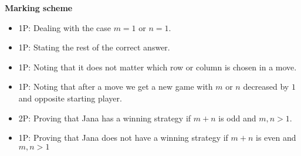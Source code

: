 {\newpage

\textbf{Marking scheme}

\begin{itemize}
    \item 1P: Dealing with the case $m=1$ or $n=1$.
    \item 1P: Stating the rest of the correct answer.
    \item 1P: Noting that it does not matter which row or column is chosen in a move.
    \item 1P: Noting that after a move we get a new game with $m$ or $n$ decreased by $1$ and opposite starting player.
    \item 2P: Proving that Jana has a winning strategy if $m+n$ is odd and $m,n>1$.
    \item 1P: Proving that Jana does not have a winning strategy if $m+n$ is even and $m,n>1$
\end{itemize}

}